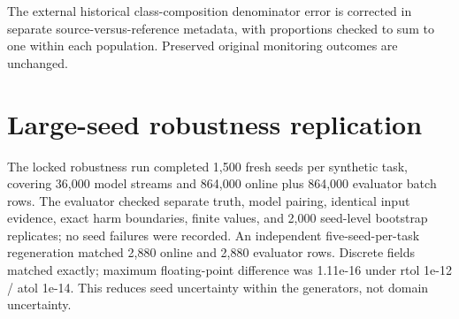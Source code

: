 \documentclass[11pt,a4paper]{article}
\begin{document}
The external historical class-composition denominator error is corrected in separate source-versus-reference metadata, with proportions checked to sum to one within each population. Preserved original monitoring outcomes are unchanged.\par


\section{Large-seed robustness replication}

The locked robustness run completed 1,500 fresh seeds per synthetic task, covering 36,000 model streams and 864,000 online plus 864,000 evaluator batch rows. The evaluator checked separate truth, model pairing, identical input evidence, exact harm boundaries, finite values, and 2,000 seed-level bootstrap replicates; no seed failures were recorded. An independent five-seed-per-task regeneration matched 2,880 online and 2,880 evaluator rows. Discrete fields matched exactly; maximum floating-point difference was 1.11e-16 under rtol 1e-12 / atol 1e-14. This reduces seed uncertainty within the generators, not domain uncertainty.\par
\end{document}
